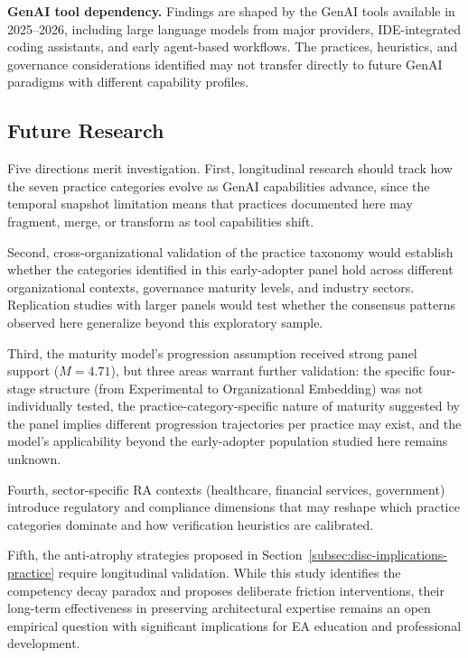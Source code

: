 \textbf{GenAI tool dependency.} Findings are shaped by the GenAI tools
available in 2025--2026, including large language models from major providers,
IDE-integrated coding assistants, and early agent-based workflows. The
practices, heuristics, and governance considerations identified may not
transfer directly to future GenAI paradigms with different capability profiles.

\subsection{Future Research}\label{subsec:future-research}

Five directions merit investigation. First, longitudinal research should track
how the seven practice categories evolve as GenAI capabilities advance, since
the temporal snapshot limitation means that practices documented here may
fragment, merge, or transform as tool capabilities shift.

Second, cross-organizational validation of the practice taxonomy would establish
whether the categories identified in this early-adopter panel hold across
different organizational contexts, governance maturity levels, and industry
sectors. Replication studies with larger panels would test whether the consensus
patterns observed here generalize beyond this exploratory sample.

Third, the maturity model's progression assumption received strong panel support
($M = 4.71$), but three areas warrant further validation: the specific four-stage
structure (from Experimental to Organizational Embedding) was not individually
tested, the practice-category-specific nature of maturity suggested by the panel
implies different progression trajectories per practice may exist, and the
model's applicability beyond the early-adopter population studied here remains
unknown.

Fourth, sector-specific RA contexts (healthcare, financial services, government)
introduce regulatory and compliance dimensions that may reshape which
practice categories dominate and how verification heuristics are calibrated.

Fifth, the anti-atrophy strategies proposed in
Section~\ref{subsec:disc-implications-practice} require longitudinal validation.
While this study identifies the competency decay paradox and proposes deliberate
friction interventions, their long-term effectiveness in preserving
architectural expertise remains an open empirical question with significant
implications for EA education and professional development.

